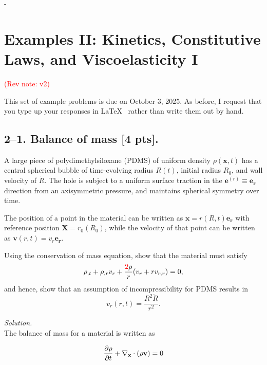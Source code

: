 -\setcounter{section}{1} %


\section*{Examples II: Kinetics, Constitutive Laws, and Viscoelasticity I}
\label{PS2}
\textcolor{red}{(Rev note: v2)}


This set of example problems is due on October 3, 2025. 
As before, I request that you type up your responses in \LaTeX~ rather than write them out by hand. 

\medskip
\subsection*{2--1. \textbf{Balance of mass} [4 pts].} 
A large piece of polydimethylsiloxane (PDMS) of uniform density $\rho(\bm{x},t)$ has a central spherical bubble of time-evolving radius $R(t)$, initial radius $R_0$, and wall velocity of $\dot{R}$. 
The hole is subject to a uniform surface traction in the $\bm{e}^{(r)} \equiv \bm{e}_{\bm{r}}$ direction from an axisymmetric pressure, and maintains spherical symmetry over time. 

\medskip
The position of a point in the material can be written as $\bm{x} = r(R,t) \bm{e}_{\bm{r}}$ with reference position $\bm{X} = r_0(R_0)$, while the velocity of that point can be written as $\bm{v}(r,t) = v_r \bm{e}_{\bm{r}}$.

\medskip
Using the conservation of mass equation, show that the material must satisfy
\begin{equation*}
\rho_{,t}+ \rho_{,r} v_r + \frac{\textcolor{red}{2}\rho}{r} (v_r + r v_{r,r}) = 0,
\end{equation*}
and hence, show that an assumption of incompressibility for PDMS results in 
\begin{equation*}
v_r(r,t) = \frac{R^2 \dot{R}}{r^2}.
\end{equation*}

\bigskip

\textit{Solution.}\\

The balance of mass for a material is written as 

\begin{equation*}
    \frac{\partial\rho}{\partial t} + \mathbf{\nabla}_\mathbf{x} \cdot(\rho\mathbf{v}) = 0 \\
\end{equation*}

